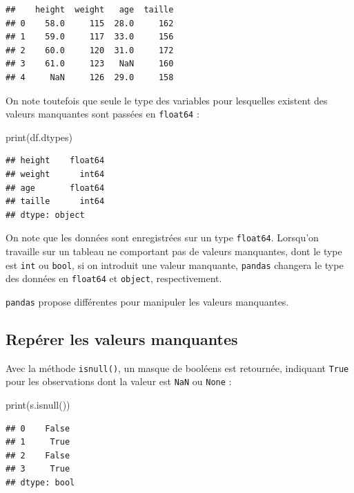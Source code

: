 \documentclass[12pt,]{book}
\newenvironment{Shaded}{\begin{snugshade}}{\end{snugshade}}
\newcommand{\BuiltInTok}[1]{#1}
\newcommand{\NormalTok}[1]{#1}
\numberwithin{equation}{section}
\numberwithin{countremarque}{section}
\let\BeginKnitrBlock\begin \let\EndKnitrBlock\end
\begin{document}
\begin{lstlisting}
##    height  weight   age  taille
## 0    58.0     115  28.0     162
## 1    59.0     117  33.0     156
## 2    60.0     120  31.0     172
## 3    61.0     123   NaN     160
## 4     NaN     126  29.0     158
\end{lstlisting}

On note toutefois que seule le type des variables pour lesquelles
existent des valeurs manquantes sont passées en \texttt{float64} :

\begin{Shaded}
\begin{Highlighting}[]
\BuiltInTok{print}\NormalTok{(df.dtypes)}
\end{Highlighting}
\end{Shaded}

\begin{lstlisting}
## height    float64
## weight      int64
## age       float64
## taille      int64
## dtype: object
\end{lstlisting}

\BeginKnitrBlock{remarque}
On note que les données sont enregistrées sur un type \texttt{float64}.
Lorsqu'on travaille sur un tableau ne comportant pas de valeurs
manquantes, dont le type est \texttt{int} ou \texttt{bool}, si on
introduit une valeur manquante, \texttt{pandas} changera le type des
données en \texttt{float64} et \texttt{object}, respectivement.
\EndKnitrBlock{remarque}

\texttt{pandas} propose différentes pour manipuler les valeurs
manquantes.

\subsection{Repérer les valeurs
manquantes}\label{reperer-les-valeurs-manquantes}

Avec la méthode \texttt{isnull()}, un masque de booléens est retournée,
indiquant \texttt{True} pour les observations dont la valeur est
\texttt{NaN} ou \texttt{None} :

\begin{Shaded}
\begin{Highlighting}[]
\BuiltInTok{print}\NormalTok{(s.isnull())}
\end{Highlighting}
\end{Shaded}

\begin{lstlisting}
## 0    False
## 1     True
## 2    False
## 3     True
## dtype: bool
\end{lstlisting}
\end{document}
